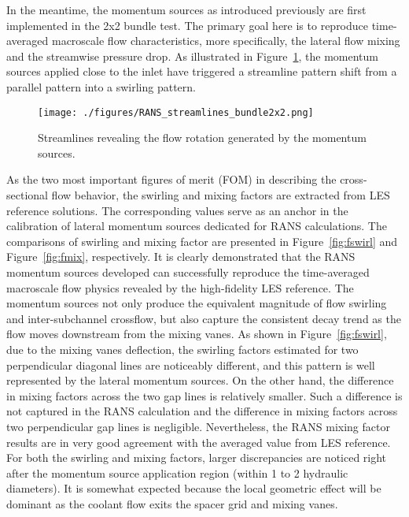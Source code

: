 In the meantime, the momentum sources as introduced previously are first implemented in the 2x2 bundle test.
The primary goal here is to reproduce time-averaged macroscale flow characteristics, more specifically, the lateral flow mixing and the streamwise pressure drop.
As illustrated in Figure~\ref{fig:streamline}, the momentum sources applied close to the inlet have triggered a streamline pattern shift from a parallel pattern into a swirling pattern.

\begin{figure}[!ht]
\centering
\texttt{[image: ./figures/RANS\_streamlines\_bundle2x2.png]}
\caption{Streamlines revealing the flow rotation generated by the momentum sources.}
\label{fig:streamline}
\end{figure}

As the two most important figures of merit (FOM) in describing the cross-sectional flow behavior, the swirling and mixing factors are extracted from LES reference solutions.
The corresponding values serve as an anchor in the calibration of lateral momentum sources dedicated for RANS calculations.
The comparisons of swirling and mixing factor are presented in Figure~\ref{fig:fswirl} and Figure~\ref{fig:fmix}, respectively.
It is clearly demonstrated that the RANS momentum sources developed can successfully reproduce the time-averaged macroscale flow physics revealed by the high-fidelity LES reference.
The momentum sources not only produce the equivalent magnitude of flow swirling and inter-subchannel crossflow, but also capture the consistent decay trend as the flow moves downstream from the mixing vanes.
As shown in Figure~\ref{fig:fswirl}, due to the mixing vanes deflection, the swirling factors estimated for two perpendicular diagonal lines are noticeably different, and this pattern is well represented by the lateral momentum sources.
On the other hand, the difference in mixing factors across the two gap lines is relatively smaller.
Such a difference is not captured in the RANS calculation and the difference in mixing factors across two perpendicular gap lines is negligible.
Nevertheless, the RANS mixing factor results are in very good agreement with the averaged value from LES reference.
For both the swirling and mixing factors, larger discrepancies are noticed right after the momentum source application region (within 1 to 2 hydraulic diameters).
It is somewhat expected because the local geometric effect will be dominant as the coolant flow exits the spacer grid and mixing vanes.

